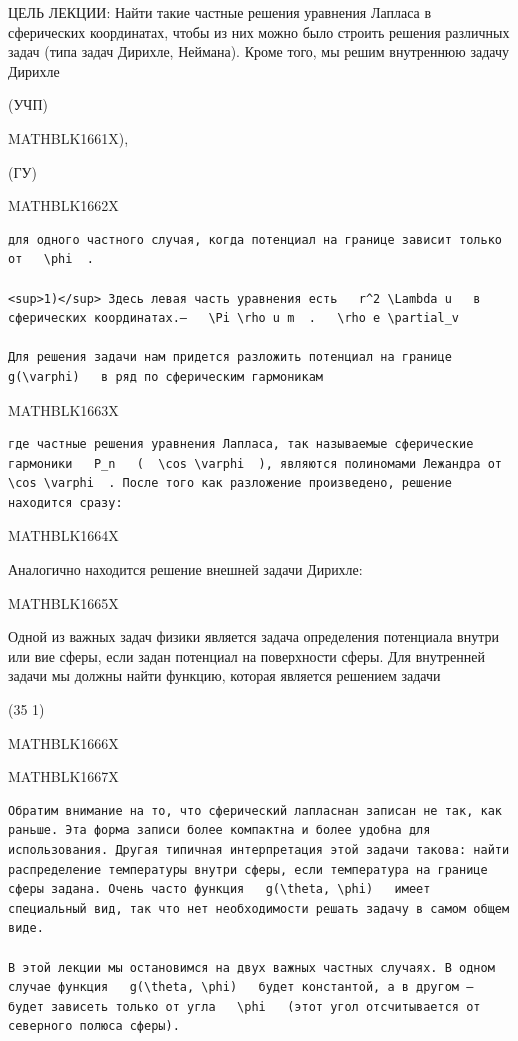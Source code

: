 \documentclass[
]{article}
\begin{document}
{{{ЦЕЛЬ ЛЕКЦИИ: Найти такие частные решения уравнения Лапласа в сферических
координатах, чтобы из них можно было строить решения различных задач
(типа задач Дирихле, Неймана). Кроме того, мы решим внутреннюю задачу
Дирихле

(УЧП)

MATHBLK1661X),

(ГУ)

MATHBLK1662X

\begin{verbatim}
для одного частного случая, когда потенциал на границе зависит только от   \phi  .

<sup>1)</sup> Здесь левая часть уравнения есть   r^2 \Lambda u   в сферических координатах.—   \Pi \rho u m  .   \rho e \partial_v 

Для решения задачи нам придется разложить потенциал на границе   g(\varphi)   в ряд по сферическим гармоникам
\end{verbatim}

MATHBLK1663X

\begin{verbatim}
где частные решения уравнения Лапласа, так называемые сферические гармоники   P_n   (  \cos \varphi  ), являются полиномами Лежандра от   \cos \varphi  . После того как разложение произведено, решение находится сразу:
\end{verbatim}

MATHBLK1664X

Аналогично находится решение внешней задачи Дирихле:

MATHBLK1665X

Одной из важных задач физики является задача определения потенциала
внутри или вие сферы, если задан потенциал на поверхности сферы. Для
внутренней задачи мы должны найти функцию, которая является решением
задачи

(35 1)

MATHBLK1666X

MATHBLK1667X

\begin{verbatim}
Обратим внимание на то, что сферический лапласнан записан не так, как раньше. Эта форма записи более компактна и более удобна для использования. Другая типичная интерпретация этой задачи такова: найти распределение температуры внутри сферы, если температура на границе сферы задана. Очень часто функция   g(\theta, \phi)   имеет специальный вид, так что нет необходимости решать задачу в самом общем виде.

В этой лекции мы остановимся на двух важных частных случаях. В одном случае функция   g(\theta, \phi)   будет константой, а в другом — будет зависеть только от угла   \phi   (этот угол отсчитывается от северного полюса сферы).
\end{verbatim}

}}}
\end{document}
